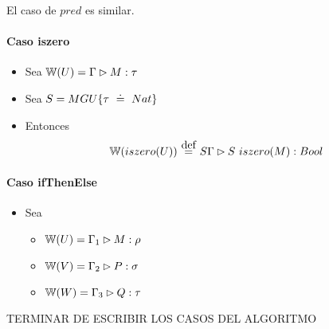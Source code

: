 El caso de $pred$ es similar.

\paragraph{Caso iszero}

\begin{itemize}
  \item Sea $\mathbb{W}(U) = \Gamma \rhd M : \tau$
  \item Sea $S = MGU\{\tau \uni Nat\}$
  \item Entonces
  \[\w{iszero(U)} \eqdef S\Gamma \rhd S\ iszero(M) : Bool\]
\end{itemize}

\paragraph{Caso ifThenElse}

\begin{itemize}
  \item Sea
    \begin{itemize}
      \item $\mathbb{W}(U) = \Gamma_1 \rhd M : \rho$
      \item $\mathbb{W}(V) = \Gamma_2 \rhd P : \sigma$
      \item $\mathbb{W}(W) = \Gamma_3 \rhd Q : \tau$
    \end{itemize}
\end{itemize}

TERMINAR DE ESCRIBIR LOS CASOS DEL ALGORITMO
